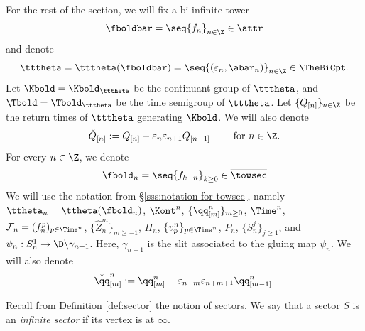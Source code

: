 \documentclass{amsart}
\begin{document}
For the rest of the section, we will fix a bi-infinite tower 
\[
\fboldbar = \seq{f_n}_{n \in \Z} \in \attr
\]
and denote 
\[
\tttheta = \tttheta(\fboldbar) = \seq{ (\varepsilon_n, \abar_n)}_{n\in\Z} \in \TheBiCpt.
\]
Let
$\Kbold = \Kbold_{\tttheta}$ be the continuant group of $\tttheta$, 
and $\Tbold = \Tbold_{\tttheta}$ be the time semigroup of $\tttheta$.
Let $\{Q_{[n]}\}_{n\in\Z}$ be the return times of $\tttheta$ generating $\Kbold$.
We will also denote
\[
    \check{Q}_{[n]} := Q_{[n]} - \varepsilon_n \varepsilon_{n+1} Q_{[n-1]} \qquad \text{ for } n \in \Z.
\]
For every $n \in \Z$, we denote 
\[
    \fbold_n = \seq{f_{k+n}}_{k \geq 0} \in \overline{\towsec}
\]
We will use the notation from \S\ref{sss:notation-for-towsec}, namely $\ttheta_n = \ttheta(\fbold_n)$, $\Kont^{n}$, $\{ \qq^n_{[m]} \}_{m \geq 0}$, $\Time^n$, $\mathcal{F}_n = (f_n^p)_{p \in \Time^n}$, $\{ \hat{Z}_n^m \}_{m \geq -1}$, $H_n$, $\{ v^n_p \}_{p \in \Time^{n}}$, $P_n$, $\{S_n^j\}_{j \geq 1}$, and $\psi_n: S_n^1 \to \D \backslash \gamma_{n+1}$.
Here, $\gamma_{n+1}$ is the slit associated to the gluing map $\psi_n$.
We will also denote
\[
    \check{\qq}^n_{[m]} := \qq^n_{[m]} - \varepsilon_{n+m} \varepsilon_{n+m+1} \qq^n_{[m-1]}.
\]

Recall from Definition \ref{def:sector} the notion of sectors. 
We say that a sector $S$ is an \emph{infinite sector} if its vertex is at $\infty$.
\end{document}
